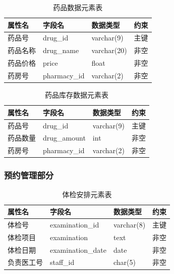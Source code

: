 \documentclass{article}
\begin{document}
\begin{table}[H]
    \centering
    \begin{tabularx}{\textwidth}{|>{\raggedright\arraybackslash}X|>{\raggedright\arraybackslash}X|>{\raggedright\arraybackslash}X|>{\raggedright\arraybackslash}X|}
    \toprule
    \textbf{属性名} & \textbf{字段名} & \textbf{数据类型} & \textbf{约束} \\ \midrule
    药品号 & drug\_id & varchar(9) & 主键 \\ \midrule
    药品名称 & drug\_name & varchar(20) & 非空 \\ \midrule
    药品价格 & price & float & 非空 \\ \midrule
    药房号 & pharmacy\_id & varchar(2) & 非空 \\ \bottomrule
    \end{tabularx}
    \caption{药品数据元素表}
    \label{tab:drug_elements}
\end{table}

\begin{table}[H]
    \centering
    \begin{tabularx}{\textwidth}{|>{\raggedright\arraybackslash}X|>{\raggedright\arraybackslash}X|>{\raggedright\arraybackslash}X|>{\raggedright\arraybackslash}X|}
    \toprule
    \textbf{属性名} & \textbf{字段名} & \textbf{数据类型} & \textbf{约束} \\ \midrule
    药品号 & drug\_id & varchar(9) & 主键 \\ \midrule
    药品数量 & drug\_amount & int & 非空 \\ \midrule
    药房号 & pharmacy\_id & varchar(2) & 非空 \\ \bottomrule
    \end{tabularx}
    \caption{药品库存数据元素表}
    \label{tab:drug_storage_elements}
\end{table}

\subsubsection{预约管理部分}

\begin{table}[H]
    \centering
    \begin{tabularx}{\textwidth}{|>{\raggedright\arraybackslash}X|>{\raggedright\arraybackslash}X|>{\raggedright\arraybackslash}X|>{\raggedright\arraybackslash}X|}
    \toprule
    \textbf{属性名} & \textbf{字段名} & \textbf{数据类型} & \textbf{约束} \\ \midrule
    体检号 & examination\_id & varchar(8) & 主键 \\ \midrule
    体检项目 & examination & text & 非空 \\ \midrule
    体检日期 & examination\_date & date & 非空 \\ \midrule
    负责医工号 & staff\_id & char(5) & 非空 \\ \bottomrule
    \end{tabularx}
    \caption{体检安排元素表}
    \label{tab:examination_arrangement_elements}
\end{table}
\end{document}
